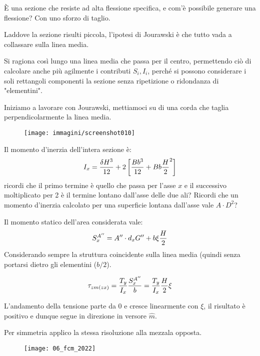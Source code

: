 \documentclass{article}
\begin{document}
\begin{adjustwidth}{2in}{}
		È una sezione che resiste ad alta flessione specifica, e com'è possibile generare una flessione? Con uno sforzo di taglio. \newline 
		
		Laddove la sezione risulti piccola, l'ipotesi di Jourawski è che tutto vada a collassare sulla linea media. 
		
		Si ragiona così lungo una linea media che passa per il centro, permettendo ciò di calcolare anche più agilmente i contributi $S_i, I_i$, perché si possono considerare i soli rettangoli componenti la sezione senza ripetizione o ridondanza di "elementini".\newline 
		
		Iniziamo a lavorare con Jourawski, mettiamoci su di una corda che taglia perpendicolarmente la linea media.
		
\begin{figure}[H]
	\centering
	\texttt{[image: immagini/screenshot010]}
	\label{fig:screenshot010}
\end{figure}


		Il momento d'inerzia dell'intera sezione è: 
		\[ I_x = \dfrac{\delta H^3}{12} + 2\left[\dfrac{Bb^3}{12}  +Bb{H\over2}^2   \right]\]
		ricordi che il primo termine è quello che passa per l'asse $x$ e il successivo moltiplicato per 2 è il termine lontano dall'asse delle due ali? Ricordi che un momento d'inerzia calcolato per una superficie lontana dall'asse vale  \(A\cdot D^2\)? \newline 
		
		Il momento statico dell'area considerata vale: 
		\[S_x^{A''}= A'' \cdot d_xG'' + b\xi {H\over2}\]
		Considerando sempre la struttura coincidente sulla linea media (quindi senza portarsi dietro gli elementini ($b/2$). \newline 
		
		\[ \tau_{zm(zx)} = \dfrac{T_y}{I_x}\dfrac{S_x^{A''}}{b} = \dfrac{T_y}{I_x} {H\over2}\xi \]
		
		L'andamento della tensione parte da $0$ e cresce linearmente con $\xi$, il risultato è positivo e dunque segue in direzione in versore $\hat{m}$. 
		
		Per simmetria applico la stessa risoluzione alla mezzala opposta. 
		
\end{adjustwidth}
\begin{figure}[H]
\texttt{[image: 06\_fcm\_2022]}
\end{figure}
\end{document}
